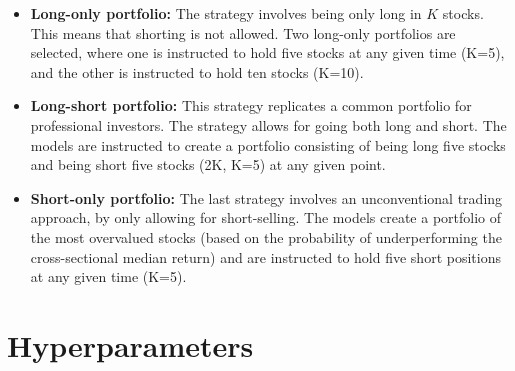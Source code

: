 \indent \newline
\begin{itemize}
\item {\textbf{Long-only portfolio:} The strategy involves being only long in $\textit{K}$ stocks. This means that shorting is not allowed. Two long-only portfolios are selected, where one is instructed to hold five stocks at any given time (K=5), and the other is instructed to hold ten stocks (K=10).} 
\item {\textbf{Long-short portfolio:} This strategy replicates a common portfolio for professional investors. The strategy allows for going both long and short. The models are instructed to create a portfolio consisting of being long five stocks and being short five stocks (2K, K=5) at any given point.}
\item {\textbf{Short-only portfolio:} The last strategy involves an unconventional trading approach, by only allowing for short-selling. The models create a portfolio of the most overvalued stocks (based on the probability of underperforming the cross-sectional median return) and are instructed to hold five short positions at any given time (K=5).}
\end{itemize}  

\indent \newline



\section{Hyperparameters}